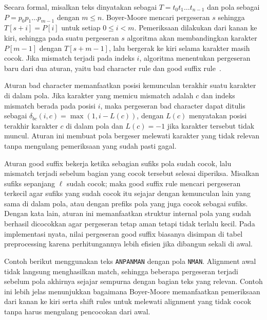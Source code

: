 Secara formal, misalkan teks dinyatakan sebagai $T = t_0 t_1 \dots t_{n-1}$ dan pola sebagai $P = p_0 p_1 \dots p_{m-1}$ dengan $m \leq n$. Boyer-Moore mencari pergeseran $s$ sehingga $T[s+i] = P[i]$ untuk setiap $0 \leq i < m$. Pemeriksaan dilakukan dari kanan ke kiri, sehingga pada suatu pergeseran $s$ algoritma akan membandingkan karakter $P[m-1]$ dengan $T[s+m-1]$, lalu bergerak ke kiri selama karakter masih cocok. Jika mismatch terjadi pada indeks $i$, algoritma menentukan pergeseran baru dari dua aturan, yaitu bad character rule dan good suffix rule \,\cite{boyer1977fast}.

Aturan bad character memanfaatkan posisi kemunculan terakhir suatu karakter di dalam pola. Jika karakter yang memicu mismatch adalah $c$ dan indeks mismatch berada pada posisi $i$, maka pergeseran bad character dapat ditulis sebagai $\delta_{bc}(i,c) = \max(1, i - L(c))$, dengan $L(c)$ menyatakan posisi terakhir karakter $c$ di dalam pola dan $L(c) = -1$ jika karakter tersebut tidak muncul. Aturan ini membuat pola bergeser melewati karakter yang tidak relevan tanpa mengulang pemeriksaan yang sudah pasti gagal.

Aturan good suffix bekerja ketika sebagian sufiks pola sudah cocok, lalu mismatch terjadi sebelum bagian yang cocok tersebut selesai diperiksa. Misalkan sufiks sepanjang $\ell$ sudah cocok; maka good suffix rule mencari pergeseran terkecil agar sufiks yang sudah cocok itu sejajar dengan kemunculan lain yang sama di dalam pola, atau dengan prefiks pola yang juga cocok sebagai sufiks. Dengan kata lain, aturan ini memanfaatkan struktur internal pola yang sudah berhasil dicocokkan agar pergeseran tetap aman tetapi tidak terlalu kecil. Pada implementasi nyata, nilai pergeseran good suffix biasanya disimpan di tabel preprocessing karena perhitungannya lebih efisien jika dibangun sekali di awal.

Contoh berikut menggunakan teks \texttt{ANPANMAN} dengan pola \texttt{NMAN}. Alignment awal tidak langsung menghasilkan match, sehingga beberapa pergeseran terjadi sebelum pola akhirnya sejajar sempurna dengan bagian teks yang relevan. Contoh ini lebih jelas menunjukkan bagaimana Boyer-Moore memanfaatkan pemeriksaan dari kanan ke kiri serta shift rules untuk melewati alignment yang tidak cocok tanpa harus mengulang pencocokan dari awal.

